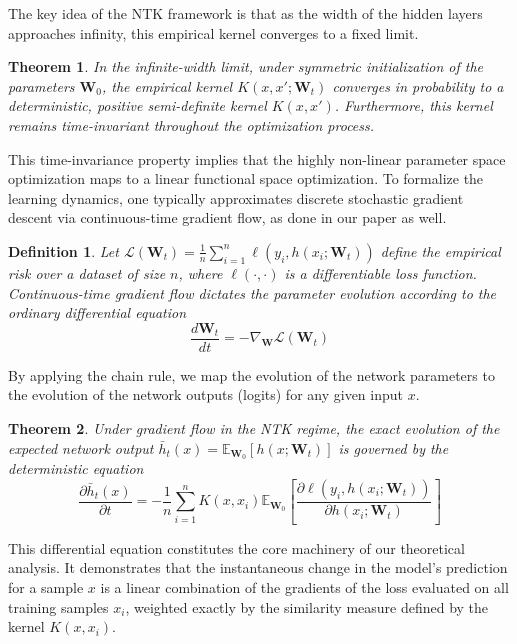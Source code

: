 \documentclass[letter,11pt]{article}
\newtheorem{theorem}{Theorem}
\newtheorem{definition}{Definition}
\begin{document}
The key idea of the NTK framework is that as the width of the hidden layers approaches infinity, this empirical kernel converges to a fixed limit.

\begin{theorem}
In the infinite-width limit, under symmetric initialization of the parameters $\mathbf{W}_0$, the empirical kernel $K(x, x'; \mathbf{W}_t)$ converges in probability to a deterministic,  positive semi-definite kernel $K(x, x')$. Furthermore, this kernel remains time-invariant throughout the optimization process.
\end{theorem}

This time-invariance property implies that the highly non-linear parameter space optimization maps to a linear functional space optimization. To formalize the learning dynamics, one typically approximates discrete stochastic gradient descent via continuous-time gradient flow, as done in our paper as well. 

\begin{definition}
Let $\mathcal{L}(\mathbf{W}_t) = \frac{1}{n} \sum_{i=1}^n \ell(y_i, h(x_i; \mathbf{W}_t))$ define the empirical risk over a dataset of size $n$, where $\ell(\cdot, \cdot)$ is a differentiable loss function. Continuous-time gradient flow dictates the parameter evolution according to the ordinary differential equation
\begin{equation}
\frac{d \mathbf{W}_t}{d t} = -\nabla_{\mathbf{W}} \mathcal{L}(\mathbf{W}_t)
\end{equation}
\end{definition}

By applying the chain rule, we map the evolution of the network parameters to the evolution of the network outputs (logits) for any given input $x$.

\begin{theorem}
Under gradient flow in the NTK regime, the exact evolution of the expected network output $\bar{h}_t(x) = \mathbb{E}_{\mathbf{W}_0}[h(x; \mathbf{W}_t)]$ is governed by the deterministic equation
\begin{equation}
\frac{\partial \bar{h}_t(x)}{\partial t} = -\frac{1}{n} \sum_{i=1}^n K(x, x_i) \mathbb{E}_{\mathbf{W}_0} \left[ \frac{\partial \ell(y_i, h(x_i; \mathbf{W}_t))}{\partial h(x_i; \mathbf{W}_t)} \right]
\end{equation}
\end{theorem}


This differential equation constitutes the core machinery of our theoretical analysis. It demonstrates that the instantaneous change in the model's prediction for a sample $x$ is a linear combination of the gradients of the loss evaluated on all training samples $x_i$, weighted exactly by the similarity measure defined by the kernel $K(x, x_i)$. 
\end{document}
